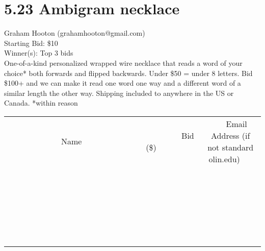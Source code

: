 \documentclass[11pt]{article}
\begin{document}
\section*{5.23 Ambigram necklace}
Graham Hooton (grahamhooton@gmail.com) \\
Starting Bid: \$10 \\
Winner(s): 
Top 3 bids \\
One-of-a-kind personalized wrapped wire necklace that reads a word of your choice* both forwards and flipped backwards. Under \$50 = under 8 letters. Bid \$100+ and we can make it read one word one way and a different word of a similar length the other way. Shipping included to anywhere in the US or Canada.
*within reason \\[6ex]
\begin{tabular}{c c c}
~~~~~~~~~~~~~Name~~~~~~~~~~~~~ & ~~~~~~~~~Bid (\$)~~~~~~~~~ & ~~~Email Address (if not standard olin.edu)~~~ \\
 & & \\
\hline
 & & \\
\hline
 & & \\
\hline
 & & \\
\hline
 & & \\
\hline
 & & \\
\hline
 & & \\
\hline
 & & \\
\hline
 & & \\
\hline
 & & \\
\hline
 & & \\
\hline
 & & \\
\hline
 & & \\
\hline
 & & \\
\hline
 & & \\
\hline
 & & \\
\hline
 & & \\
\hline
 & & \\
\hline
 & & \\
\hline
 & & \\
\hline
 & & \\
\hline
 & & \\
\hline
 & & \\
\hline
 & & \\
\hline
 & & \\
\hline
 & & \\
\hline
\end{tabular}
\clearpage
\end{document}

